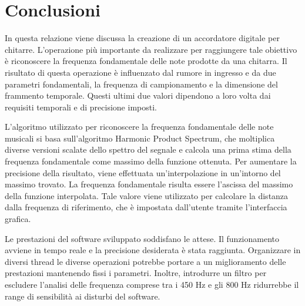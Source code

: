 \chapter{Conclusioni}\label{cap:conclusioni}

In questa relazione viene discussa la creazione di un accordatore digitale per chitarre.
L'operazione più importante da realizzare per raggiungere tale obiettivo è riconoscere la frequenza fondamentale delle note prodotte da una chitarra.
Il risultato di questa operazione è influenzato dal rumore in ingresso e da due parametri fondamentali, la frequenza di campionamento e la dimensione del frammento temporale.
Questi ultimi due valori dipendono a loro volta dai requisiti temporali e di precisione imposti.

L'algoritmo utilizzato per riconoscere la frequenza fondamentale delle note musicali si basa sull'algoritmo Harmonic Product Spectrum, che moltiplica diverse versioni scalate dello spettro del segnale e calcola una prima stima della frequenza fondamentale come massimo della funzione ottenuta.
Per aumentare la precisione della risultato, viene effettuata un'interpolazione in un'intorno del massimo trovato.
La frequenza fondamentale risulta essere l'ascissa del massimo della funzione interpolata.
Tale valore viene utilizzato per calcolare la distanza dalla frequenza di riferimento, che è impostata dall'utente tramite l'interfaccia grafica. 

Le prestazioni del software sviluppato soddisfano le attese.
Il funzionamento avviene in tempo reale e la precisione desiderata è stata raggiunta. 
Organizzare in diversi thread le diverse operazioni potrebbe portare a un miglioramento delle prestazioni mantenendo fissi i parametri.
Inoltre, introdurre un filtro per escludere l'analisi delle frequenza comprese tra i 450 Hz e gli 800 Hz ridurrebbe il range di sensibilità ai disturbi del software.



